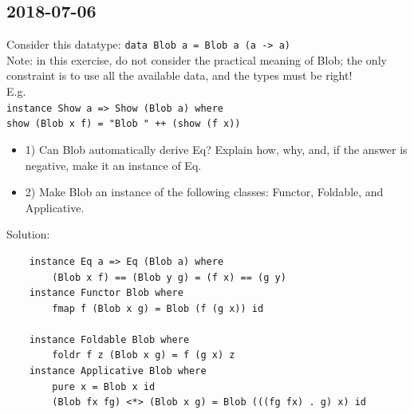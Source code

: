 \subsection{2018-07-06}
Consider this datatype: \texttt{data Blob a = Blob a (a -> a)} \\
Note: in this exercise, do not consider the practical meaning of Blob; the only constraint is to use all the available data, and the
types must be right! \\
E.g. \\
\texttt{instance Show a => Show (Blob a) where} \\
 \texttt{show (Blob x f) = "Blob " ++ (show (f x))}
\begin{itemize}
    \item 1) Can Blob automatically derive Eq? Explain how, why, and, if the answer is negative, make it an instance of Eq.
    \item 2) Make Blob an instance of the following classes: Functor, Foldable, and Applicative.
\end{itemize}
Solution:
\begin{lstlisting}
    instance Eq a => Eq (Blob a) where
        (Blob x f) == (Blob y g) = (f x) == (g y)
    instance Functor Blob where
        fmap f (Blob x g) = Blob (f (g x)) id

    instance Foldable Blob where
        foldr f z (Blob x g) = f (g x) z
    instance Applicative Blob where
        pure x = Blob x id
        (Blob fx fg) <*> (Blob x g) = Blob (((fg fx) . g) x) id
\end{lstlisting}